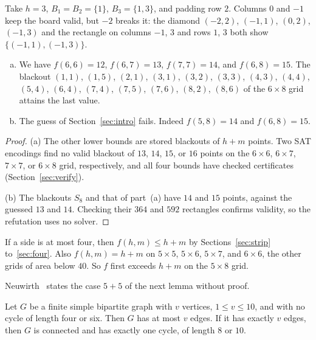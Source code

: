 \begin{remark}\label{rem:interior}
Take $h=3$, $B_1=B_2=\{1\}$, $B_3=\{1,3\}$, and padding row $2$. Columns $0$ and $-1$
keep the board valid, but $-2$ breaks it: the diamond $(-2,2)$,
$(-1,1)$, $(0,2)$, $(-1,3)$ and the rectangle on columns $-1$, $3$ and rows $1$, $3$ both
show $\{(-1,1),(-1,3)\}$.
\end{remark}

\begin{theorem}\label{thm:refute}
\begin{enumerate}[(a)]
\item We have $f(6,6)=12$, $f(6,7)=13$, $f(7,7)=14$, and $f(6,8)=15$. The blackout $(1,1)$,
$(1,5)$, $(2,1)$, $(3,1)$, $(3,2)$, $(3,3)$, $(4,3)$, $(4,4)$, $(5,4)$, $(6,4)$, $(7,4)$,
$(7,5)$, $(7,6)$, $(8,2)$, $(8,6)$ of the $6\times8$ grid attains the last value.
\item The guess of Section~\ref{sec:intro} fails. Indeed $f(5,8)=14$ and $f(6,8)=15$.
\end{enumerate}
\end{theorem}

\begin{proof}
(a) The other lower bounds are stored blackouts of $h+m$ points. Two SAT encodings find no
valid blackout of $13$, $14$, $15$, or $16$ points on the $6\times6$, $6\times7$,
$7\times7$, or $6\times8$ grid, respectively, and all four bounds have checked certificates
(Section~\ref{sec:verify}).

(b) The blackouts $S_8$ and that of part~(a) have $14$ and $15$ points, against the guessed
$13$ and $14$. Checking their $364$ and $592$ rectangles confirms validity, so the
refutation uses no solver.
\end{proof}

If a side is at most four, then $f(h,m)\le h+m$ by Sections~\ref{sec:strip}
to~\ref{sec:four}. Also $f(h,m)=h+m$ on $5\times5$, $5\times6$, $5\times7$, and $6\times6$,
the other grids of area below $40$. So $f$ first exceeds $h+m$ on the $5\times8$ grid.

Neuwirth~\cite[Remark~18]{neuwirth2001} states the case $5+5$ of the next lemma without
proof.

\begin{lemma}\label{lem:tenvertices}
Let $G$ be a finite simple bipartite graph with $v$ vertices, $1\le v\le10$, and with no cycle
of length four or six. Then $G$ has at most $v$ edges. If it has exactly $v$ edges, then $G$ is
connected and has exactly one cycle, of length $8$ or $10$.
\end{lemma}

